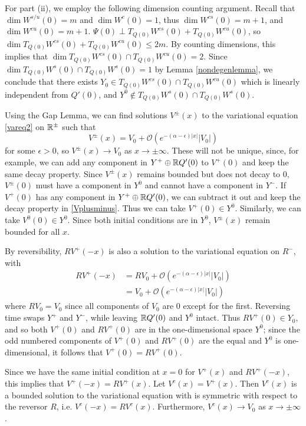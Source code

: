 \documentclass[thesis.tex]{subfiles}
\begin{document}
For part (ii), we employ the following dimension counting argument. Recall that $\dim W^{s/u}(0) = m$ and $\dim W^c(0) = 1$, thus $\dim W^{cs}(0) = m + 1$, and $\dim W^{cu}(0) = m + 1$. $\Psi(0) \perp T_{Q(0)}W^{cs}(0) + T_{Q(0)}W^{cu}(0)$, so $\dim T_{Q(0)}W^{cs}(0) + T_{Q(0)}W^{cu}(0) \leq 2m$. By counting dimensions, this implies that $\dim T_{Q(0)}W^{cs}(0) \cap T_{Q(0)}W^{cu}(0) = 2$. Since $\dim T_{Q(0)}W^s(0) \cap T_{Q(0)}W^s(0) = 1$ by Lemma \ref{nondegenlemma}, we conclude that there exists $Y_0 \in T_{Q(0)}W^{cs}(0) \cap T_{Q(0)}W^{cu}(0)$ which is linearly independent from $Q'(0)$, and $Y^0 \notin T_{Q(0)}W^s(0) \cap T_{Q(0)}W^s(0)$.

Using the Gap Lemma, we can find solutions $V^\pm(x)$ to the variational equation \eqref{vareq2} on ${\mathbb R}^\pm$ such that
\begin{equation}\label{Vplusminus}
V^\pm(x) = V_0 + \mathcal{O}(e^{-(\alpha - \epsilon)|x|}|V_0|)
\end{equation}
for some $\epsilon > 0$, so $V^\pm(x) \rightarrow V_0$ as $x \rightarrow \pm \infty$. These will not be unique, since, for example, we can add any component in $Y^+ \oplus {\mathbb R} Q'(0)$ to $V^+(0)$ and keep the same decay property. Since $V^\pm(x)$ remains bounded but does not decay to 0, $V^\pm(0)$ must have a component in $Y^0$ and cannot have a component in $Y^-$. If $V^+(0)$ has any component in $Y^+ \oplus {\mathbb R} Q'(0)$, we can subtract it out and keep the decay property in \eqref{Vplusminus}. Thus we can take $V^+(0) \in Y^0$. Similarly, we can take $V^0(0) \in Y^0$. Since both initial conditions are in $Y^0$, $V^\pm(x)$ remain bounded for all $x$.

By reversibility, $RV^+(-x)$ is also a solution to the variational equation on $R^-$, with 
\begin{align*}
R V^+(-x) &= R V_0 + \mathcal{O}(e^{-(\alpha - \epsilon)|x|}|V_0|) \\
&= V_0 + \mathcal{O}(e^{-(\alpha - \epsilon)|x|}|V_0|)
\end{align*}
where $R V_0 = V_0$ since all components of $V_0$ are 0 except for the first. Reversing time swaps $Y^+$ and $Y^-$, while leaving ${\mathbb R} Q'(0)$ and $Y^0$ intact. Thus $RV^+(0) \in Y_0$, and so both $V^+(0)$ and $RV^+(0)$ are in the one-dimensional space $Y^0$; since the odd numbered components of $V^+(0)$ and $RV^+(0)$ are the equal and $Y^0$ is one-dimensional, it follows that $V^+(0) = RV^+(0)$.

Since we have the same initial condition at $x = 0$ for $V^+(x)$ and $RV^+(-x)$, this implies that $V^+(-x) = RV^+(x)$. Let $V^c(x) = V^+(x)$. Then $V^c(x)$ is a bounded solution to the variational equation with is symmetric with respect to the reversor $R$, i.e. $V^c(-x) = RV^c(x)$. Furthermore, $V^c(x) \rightarrow V_0$ as $x \rightarrow \pm \infty$.
\end{document}
